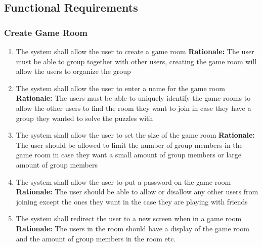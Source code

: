 \documentclass[12pt]{article}
\begin{document}
\subsection{Functional Requirements}
\subsubsection{Create Game Room}
\begin{enumerate}[label=CG\arabic*., series=CreateGame]
    \item The system shall allow the user to create a game room \newline 
    \textbf{Rationale:} The user must be able to group together with other users, creating the game room will allow the users to organize the group
    \item The system shall allow the user to enter a name for the game room \newline
    \textbf{Rationale:} The users must be able to uniquely identify the game rooms to allow the other users to find the room they want to join in case they have a group they wanted to solve the puzzles with
    \item The system shall allow the user to set the size of the game room \newline
    \textbf{Rationale:} The user should be allowed to limit the number of group members in the game room in case they want a small amount of group members or large amount of group members
    \item The system shall allow the user to put a password on the game room \newline
    \textbf{Rationale:} The user should be able to allow or disallow any other users from joining except the ones they want in the case they are playing with friends
    \item The system shall redirect the user to a new screen when in a game room \newline
    \textbf{Rationale: } The users in the room should have a display of the game room and the amount of group members in the room etc. 
\end{enumerate}
\end{document}
